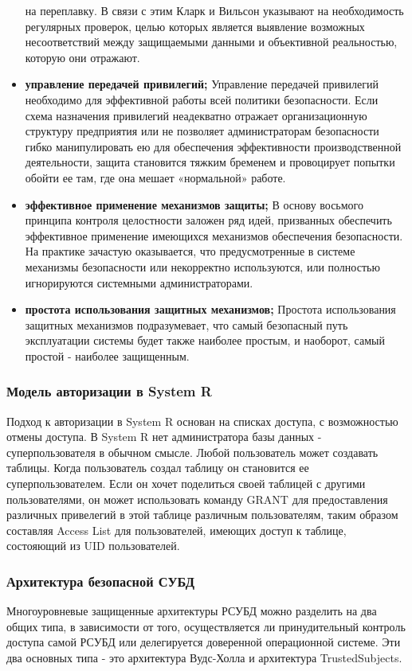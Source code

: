 \begin{itemize}
    на переплавку. В связи с этим Кларк и Вильсон указывают на необходимость регулярных проверок,
    целью которых является выявление возможных несоответствий между защищаемыми данными и объективной
    реальностью, которую они отражают.
    \item \textbf{управление передачей привилегий;}
    Управление передачей привилегий необходимо для эффективной работы всей политики безопасности.
    Если схема назначения привилегий неадекватно отражает организационную структуру предприятия или
    не позволяет администраторам безопасности гибко манипулировать ею для обеспечения эффективности
    производственной деятельности, защита становится тяжким бременем и провоцирует попытки обойти ее
    там, где она мешает «нормальной» работе.
    \item \textbf{эффективное применение механизмов защиты;}
    В основу восьмого принципа контроля целостности заложен ряд идей, призванных обеспечить эффективное
    применение имеющихся механизмов обеспечения безопасности. На практике зачастую оказывается, что
    предусмотренные в системе механизмы безопасности или некорректно используются, или полностью
    игнорируются системными администраторами.
    \item \textbf{простота использования защитных механизмов;}
    Простота использования защитных механизмов подразумевает, что самый безопасный путь эксплуатации системы
    будет также наиболее простым, и наоборот, самый простой - наиболее защищенным.
\end{itemize}

\subsubsection{Модель авторизации в System R}
Подход к авторизации в System R основан на списках доступа, с возможностью отмены доступа.
В System R нет администратора базы данных - суперпользователя в обычном смысле. Любой пользователь может создавать таблицы.
Когда пользователь создал таблицу он становится ее суперпользователем.
Если он хочет поделиться своей таблицей с другими пользователями, он может использовать команду GRANT для
предоставления различных привелегий в этой таблице различным пользователям, таким образом составляя
Access List для пользователей, имеющих доступ к таблице, состояющий из UID пользователей.

\subsubsection{Архитектура безопасной СУБД}
Многоуровневые защищенные архитектуры РСУБД можно разделить на два общих типа, в зависимости от того,
осуществляется ли принудительный контроль доступа самой РСУБД или делегируется доверенной операционной системе.
Эти два основных типа - это архитектура Вудс-Холла и архитектура TrustedSubjects.
